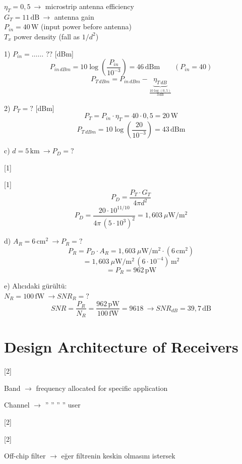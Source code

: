 \documentclass[11pt,a4paper]{article}
\begin{document}

\begin{ornek}
$\eta_T=0{,}5\ \to$ microstrip antenna efficiency\\
$G_T=11\,\mathrm{dB}\ \to$ antenna gain\\
$P_{in}=40\,\mathrm{W}$ (input power before antenna)\\
$T_x$ power density (fall as $1/d^2$)
\end{ornek}

1) $P_{in}=\ldots\ldots$ ?? [dBm]
\[ P_{in\,dBm}=10\log\left(\frac{P_{in}}{10^{-3}}\right)=46\,\mathrm{dBm} \qquad (P_{in}=40) \]
\[ P_{T\,dBm}=P_{in\,dBm}-\underbrace{\eta_{T\,dB}}_{\frac{10\log(0{,}5)}{3\,\mathrm{dB}}} \]

2) $P_T=?$ [dBm]
\[ P_T=P_{in}\cdot\eta_T=40\cdot 0{,}5=20\,\mathrm{W} \]
\[ P_{T\,dBm}=10\log\left(\frac{20}{10^{-3}}\right)=43\,\mathrm{dBm} \]

c) $d=5\,\mathrm{km}\ \to P_D=?$

[1]

[1]
\[ P_D=\frac{P_T\cdot G_T}{4\pi d^2} \]
\[ P_D=\frac{20\cdot 10^{11/10}}{4\pi\,(5\cdot 10^3)^2}=1{,}603\ \mu\mathrm{W/m^2} \]

d) $A_R=6\,\mathrm{cm^2}\ \to P_R=?$
\[ P_R=P_D\cdot A_R=1{,}603\ \mu\mathrm{W/m^2}\cdot(6\,\mathrm{cm^2}) \]
\[ =1{,}603\ \mu\mathrm{W/m^2}\,(6\cdot 10^{-4})\,\mathrm{m^2} \]
\[ =P_R=962\,\mathrm{pW} \]

e) Alıcıdaki gürültü:\\
$N_R=100\,\mathrm{fW}\ \to SNR_R=?$
\[ SNR=\frac{P_R}{N_R}=\frac{962\,\mathrm{pW}}{100\,\mathrm{fW}}=9618\ \to SNR_{dB}=39{,}7\,\mathrm{dB} \]

\section{Design Architecture of Receivers}

[2]

Band $\to$ frequency allocated for specific application

Channel $\to$ '' '' '' '' user

[2]

[2]

Off-chip filter $\to$ eğer filtrenin keskin olmasını istersek
\end{document}
